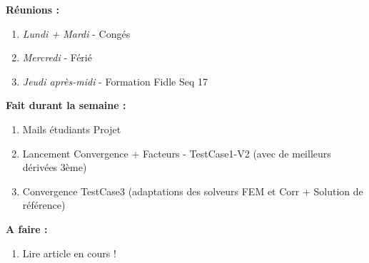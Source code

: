 \textbf{Réunions :}
\begin{enumerate}[label=\textbullet]
	\item \textit{Lundi + Mardi} - Congés
	\item \textit{Mercredi} - Férié
	\item \textit{Jeudi après-midi} - Formation Fidle Seq 17
\end{enumerate}
\textbf{Fait durant la semaine :}
\begin{enumerate}[label=\textbullet]
	\item Mails étudiants Projet
	\item Lancement Convergence + Facteurs - TestCase1-V2 (avec de meilleurs dérivées 3ème)
	\item Convergence TestCase3 (adaptations des solveurs FEM et Corr + Solution de référence)
\end{enumerate}
\textbf{A faire :}
\begin{enumerate}[label=\textbullet]
	\item Lire article en cours !
\end{enumerate}